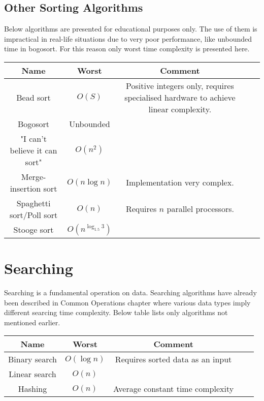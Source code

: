 \documentclass{article}
\begin{document}

\newpage
\subsection*{Other Sorting Algorithms}

Below algorithms are presented for educational purposes only. The use of them is impractical in real-life situations due to very poor performance, like unbounded time in bogosort. For this reason only worst time complexity is presented here.

\begin{table}[ht]
	\centering
	\scriptsize
	\begin{tabular}{ccccc}
		\textbf{Name} &\textbf{Worst} & \textbf{Comment}\\
		\hline
		Bead sort\footnotemark[15] & $O(S)$ & Positive integers only, requires specialised hardware to achieve linear complexity.\\
		Bogosort & Unbounded & \\
		"I can't believe it can sort" & $O(n^2)$ & \\
		Merge-insertion sort & $O(n \log{n})$ & Implementation very complex.\\
		Spaghetti sort/Poll sort & $O(n)$ & Requires $n$ parallel processors.\\
		Stooge sort & $O(n^{\log_{1.5}{3}})$ & \\
		\hline
	\end{tabular}
\end{table}


\newpage
\section*{Searching}

Searching is a fundamental operation on data. Searching algorithms have already been described in Common Operations chapter where various data types imply different searcing time complexity. Below table lists only algorithms not mentioned earlier. 

\begin{table}[ht]
	\centering
	\scriptsize
	\begin{tabular}{ccccc}
		\textbf{Name} &\textbf{Worst} & \textbf{Comment}\\
		\hline
		Binary search & $O(\log{n})$ & Requires sorted data as an input\\
		Linear search & $O(n)$ & \\
		Hashing & $O(n)$ & Average constant time complexity\\
		\hline
	\end{tabular}
\end{table}
\end{document}
